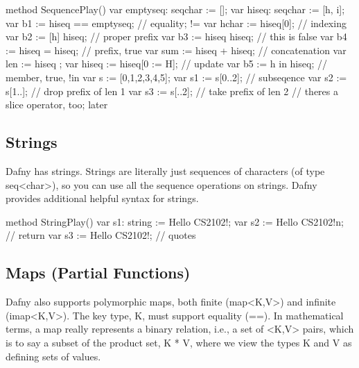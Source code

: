 \documentclass[letterpaper,10pt,english]{sphinxmanual}
\begin{document}
\begin{sphinxVerbatim}[commandchars=\\\{\}]
method SequencePlay()
\PYGZob{}
    var empty\PYGZus{}seq: seq\PYGZlt{}char\PYGZgt{} := [];
    var hi\PYGZus{}seq: seq\PYGZlt{}char\PYGZgt{} := [\PYGZsq{}h\PYGZsq{}, \PYGZsq{}i\PYGZsq{}];
    var b1 := hi\PYGZus{}seq == empty\PYGZus{}seq; // equality; !=
    var hchar := hi\PYGZus{}seq[0];        // indexing
    var b2 := [\PYGZsq{}h\PYGZsq{}] \PYGZlt{} hi\PYGZus{}seq;   // proper prefix
    var b3 := hi\PYGZus{}seq \PYGZlt{} hi\PYGZus{}seq;  // this is false
    var b4 := hi\PYGZus{}seq \PYGZlt{}= hi\PYGZus{}seq; // prefix, true
    var sum := hi\PYGZus{}seq + hi\PYGZus{}seq; // concatenation
    var len := \textbar{} hi\PYGZus{}seq \textbar{};
    var hi\PYGZus{}seq := hi\PYGZus{}seq[0 := \PYGZsq{}H\PYGZsq{}]; // update
    var b5 := \PYGZsq{}h\PYGZsq{} in hi\PYGZus{}seq; // member, true, !in
    var s := [0,1,2,3,4,5];
    var s1 := s[0..2];  // subseqence
    var s2 := s[1..];   // \PYGZdq{}drop\PYGZdq{} prefix of len 1
    var s3 := s[..2];   // \PYGZdq{}take\PYGZdq{} prefix of len 2
    // there\PYGZsq{}s a slice operator, too; later
 \PYGZcb{}
\end{sphinxVerbatim}


\subsection{Strings}
\label{\detokenize{06-dafny-language:strings}}
Dafny has strings. Strings are literally just sequences of characters
(of type seq\textless{}char\textgreater{}), so you can use all the sequence operations on
strings.  Dafny provides additional helpful syntax for strings.

\begin{sphinxVerbatim}[commandchars=\\\{\}]
method StringPlay()
 \PYGZob{}
     var s1: string := \PYGZdq{}Hello CS2102!\PYGZdq{};
     var s2 := \PYGZdq{}Hello CS2102!\PYGZbs{}n\PYGZdq{};   // return
     var s3 := \PYGZdq{}\PYGZbs{}\PYGZdq{}Hello CS2102!\PYGZbs{}\PYGZdq{}\PYGZdq{}; // quotes
 \PYGZcb{}
\end{sphinxVerbatim}


\subsection{Maps (Partial Functions)}
\label{\detokenize{06-dafny-language:maps-partial-functions}}
Dafny also supports polymorphic maps, both finite (map\textless{}K,V\textgreater{}) and
infinite (imap\textless{}K,V\textgreater{}).  The key type, K, must support equality (==).
In mathematical terms, a map really represents a binary relation,
i.e., a set of \textless{}K,V\textgreater{} pairs, which is to say a subset of the product
set, K * V, where we view the types K and V as defining sets of
values.
\end{document}

